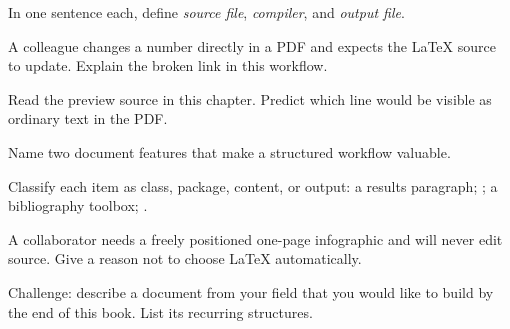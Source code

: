 \begin{chapterexercises}
  \item In one sentence each, define \emph{source file}, \emph{compiler}, and
        \emph{output file}.
  \item A colleague changes a number directly in a PDF and expects the \LaTeX{}
        source to update. Explain the broken link in this workflow.
  \item Read the preview source in this chapter. Predict which line would be
        visible as ordinary text in the PDF.
  \item Name two document features that make a structured workflow valuable.
  \item Classify each item as class, package, content, or output: a results
        paragraph; ; a bibliography toolbox; .
  \item A collaborator needs a freely positioned one-page infographic and
        will never edit source. Give a reason not to choose \LaTeX{} automatically.
  \item Challenge: describe a document from your field that you would like to
        build by the end of this book. List its recurring structures.
\end{chapterexercises}
